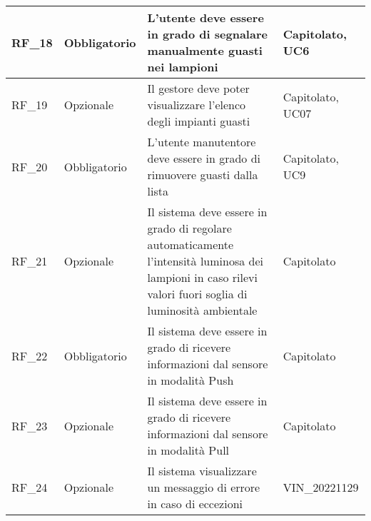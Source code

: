 \begin{center}
\begin{xltabular}{\linewidth}{|l|l|X|l|}
        \hline
        RF\_18 & Obbligatorio & L'utente deve essere in grado di segnalare manualmente guasti nei lampioni & Capitolato, UC6 \\

        \hline
        RF\_19 & Opzionale & Il gestore deve poter visualizzare l'elenco degli impianti guasti & Capitolato, UC07 \\

        \hline
        RF\_20 & Obbligatorio & L'utente manutentore deve essere in grado di rimuovere guasti dalla lista & Capitolato, UC9 \\

        \hline
        RF\_21 & Opzionale & Il sistema deve essere in grado di regolare automaticamente l'intensità luminosa dei lampioni in caso rilevi valori fuori soglia di luminosità ambientale & Capitolato\\

        \hline
        RF\_22 & Obbligatorio & Il sistema deve essere in grado di ricevere informazioni dal sensore in modalità Push & Capitolato \\

        \hline
        RF\_23 & Opzionale & Il sistema deve essere in grado di ricevere informazioni dal sensore in modalità Pull & Capitolato \\

        \hline
        RF\_24 & Opzionale & Il sistema visualizzare un messaggio di errore in caso di eccezioni & VIN\_20221129 \\ %

        \hline
    \end{xltabular}
\end{center}


